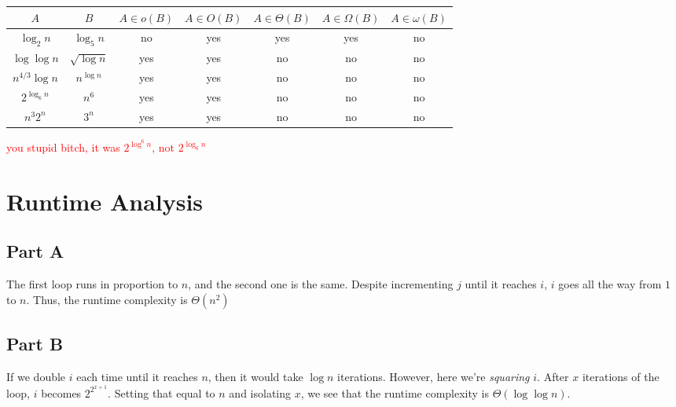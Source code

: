 \documentclass[12pt]{article}
\begin{document}
\begin{table}[H]
    \centering
    \begin{tabular}{|c|c|c|c|c|c|c|}
        \hline
        $A$              & $B$             & $A \in o(B)$ & $A \in O(B)$ & $A \in \Theta(B)$ & $A \in \Omega(B)$ & $A \in \omega(B)$ \\
        \hline
        $\log_2 n$       & $\log_5 n$      & no           & yes          & yes               & yes               & no                \\
        \hline
        $\log \log n$    & $\sqrt{\log n}$ & yes          & yes          & no                & no                & no                \\
        \hline
        $n^{4/3} \log n$ & $n^{\log n}$    & yes          & yes          & no                & no                & no                \\
        \hline
        $2^{\log_6 n}$   & $n^6$           & yes          & yes          & no                & no                & no                \\
        \hline
        $n^3 2^n$        & $3^n$           & yes          & yes          & no                & no                & no                \\
        \hline
    \end{tabular}
\end{table}

\textcolor{red}{you stupid bitch, it was $2^{\log^6 n}$, not $2^{\log_6 n}$}

\section{Runtime Analysis}

\subsection*{Part A}

The first loop runs in proportion to $n$, and the second one is the same.
Despite incrementing $j$ until it reaches $i$, $i$ goes all the way from $1$ to $n$.
Thus, the runtime complexity is $\Theta(n^2)$

\subsection*{Part B}

If we double $i$ each time until it reaches $n$, then it would take $\log n$ iterations.
However, here we're \textit{squaring} $i$.
After $x$ iterations of the loop, $i$ becomes $2^{2^{x+1}}$.
Setting that equal to $n$ and isolating $x$, we see that the runtime
complexity is $\Theta(\log \log n)$.
\end{document}
